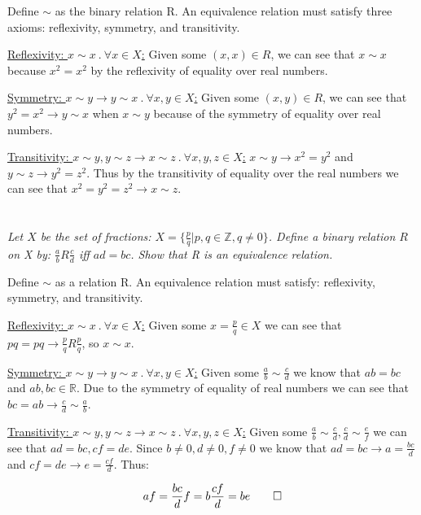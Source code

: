 \documentclass[]{article}
\newcommand{\integers}{\mathbb{Z}}
\newcommand{\reals}{\mathbb{R}}
\begin{document}
			Define $\sim$ as the binary relation R. An equivalence relation must satisfy three axioms: reflexivity, symmetry, and transitivity.

			\underline{Reflexivity: $x \sim x\ .\ \forall x \in X$:}
				Given some $(x, x) \in R$, we can see that $x \sim x$ because $x^2 = x^2$ by the reflexivity of equality over real numbers. 

			\underline{Symmetry: $x \sim y \to y \sim x\ .\ \forall x, y \in X$:}
				Given some $(x, y) \in R$, we can see that $y^2 = x^2 \to y \sim x$ when $x \sim y$ because of the symmetry of equality over real numbers.

			\underline{Transitivity: $x \sim y, y \sim z \to x \sim z\ .\ \forall x, y, z \in X$:}
				$x \sim y \to x^2 = y^2$ and $y \sim z \to y^2 = z^2$. Thus by the transitivity of equality over the real numbers we can see that $x^2 = y^2 = z^2 \to x \sim z$. 

	\section{}
		\textit{Let $X$ be the set of fractions: $X = \{\frac{p}{q} | p, q \in \integers, q \neq 0\}$. Define a binary relation $R$ on X by: $\frac{a}{b}R\frac{c}{d}$ iff $ad = bc$. Show that R is an equivalence relation.}

			Define $\sim$ as a relation R. An equivalence relation must satisfy: reflexivity, symmetry, and transitivity.

			\underline{Reflexivity: $x \sim x\ .\ \forall x \in X$:}
				Given some $x = \frac{p}{q} \in X$ we can see that $pq = pq \to \frac{p}{q}R\frac{p}{q}$, so $x \sim x$. 

			\underline{Symmetry: $x \sim y \to y \sim x\ .\ \forall x, y \in X$:}
				Given some $\frac{a}{b} \sim \frac{c}{d}$ we know that $ab = bc$ and $ab, bc \in \reals$. Due to the symmetry of equality of real numbers we can see that $bc = ab \to \frac{c}{d} \sim \frac{a}{b}$.

			\underline{Transitivity: $x \sim y, y \sim z \to x \sim z\ .\ \forall x, y, z \in X$:} 
				Given some $\frac{a}{b} \sim \frac{c}{d}, \frac{c}{d} \sim \frac{e}{f}$ we can see that $ad = bc, cf = de$. Since $b \neq 0, d \neq 0, f \neq 0$ we know that $ad = bc \to a = \frac{bc}{d}$ and $cf = de \to e = \frac{cf}{d}$. Thus:

				\[
					af = \frac{bc}{d} f
					= b \frac{cf}{d}
					= be \qed
				\]

	
\end{document}
